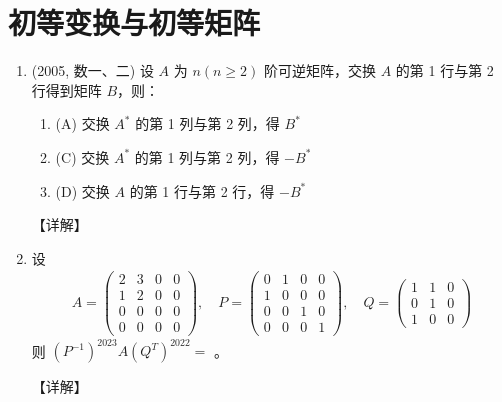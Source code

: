 \documentclass[12pt, a4paper, oneside, UTF8]{ctexbook}
\begin{document}
\section{初等变换与初等矩阵}

\begin{enumerate}[label=\arabic*.,start=10]
    \item (2005, 数一、二) 设 $ A $ 为 $ n(n \geq 2) $ 阶可逆矩阵，交换 $ A $ 的第 1 行与第 2 行得到矩阵 $ B $，则：
    \begin{enumerate}
        \item (A) 交换 $ A^* $ 的第 1 列与第 2 列，得 $ B^* $
        \item (C) 交换 $ A^* $ 的第 1 列与第 2 列，得 $ -B^* $
        \item (D) 交换 $ A $ 的第 1 行与第 2 行，得 $ -B^* $
    \end{enumerate}
    
    \begin{solution}
    【详解】
    \end{solution}
    
    \item 设 
    \begin{align*}
    A = \begin{pmatrix}
    2 & 3 & 0 & 0 \\
    1 & 2 & 0 & 0 \\
    0 & 0 & 0 & 0 \\
    0 & 0 & 0 & 0
    \end{pmatrix}, \quad
    P = \begin{pmatrix}
    0 & 1 & 0 & 0 \\
    1 & 0 & 0 & 0 \\
    0 & 0 & 1 & 0 \\
    0 & 0 & 0 & 1
    \end{pmatrix}, \quad
    Q = \begin{pmatrix}
    1 & 1 & 0 \\
    0 & 1 & 0 \\
    1 & 0 & 0
    \end{pmatrix}
    \end{align*}
    则 $ (P^{-1})^{2023} A (Q^T)^{2022} = $ \underline{\hspace{3cm}}。
    
    \begin{solution}
    【详解】
    \end{solution}
\end{enumerate}

\ifx\allfiles\undefined
\end{document}
